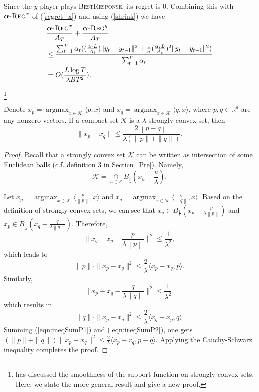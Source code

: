 \documentclass[final,12pt]{colt2018} %
\def\reals{\mathbb{R}}
\def\reals{\mathbb{R}}
\def\K{\mathcal{K}}
\def\argmax{\mathop{\arg\max}}
\def\balpha{\boldsymbol{\alpha}}
\def\BR{\textsc{BestResponse}\xspace}
\newcommand{\norm}[1]{\left\lVert#1\right\rVert}
\newcommand{\regret}[1]{\balpha\textsc{-Reg}^{#1}}
\begin{document}
Since the $y$-player plays \BR, its regret is $0$.
Combining this with $\regret{x}$ of (\ref{regret_x}) and using (\ref{shrink})
we have 
\begin{equation}
\begin{aligned}
&\frac{ \regret{x} }{ A_T} + \frac{ \regret{y} }{ A_T}
\\ & \leq  \frac{\sum_{t=1}^T
\alpha_t  ( (\frac{\alpha_t L}{A_t})  \| y_t - y_{t-1} \|^2 + \frac{1}{\sigma} (\frac{\alpha_t L }{A_t})^2  \| y_t - y_{t-1} \|^2 ) 
 }{ \sum_{t=1}^T \alpha_t}
\\ & =  O( \frac{L \log T }{\lambda B T^2}  ).
\end{aligned}
\end{equation}



\begin{lemma}  \label{lm:lip}
\footnote{\cite{P96} has discussed the smoothness of the support function on strongly convex sets.
Here, we state the more general result and give a new proof.}

Denote  
$x_p = \argmax_{x \in \K} \langle p, x\rangle $ and $x_q = \argmax_{x \in \K} \langle q, x\rangle $, where $p,q \in \reals^d$ are any nonzero vectors.  
If a compact set $\K$ is a $\lambda$-strongly convex set,
then 
\begin{equation}
    \| x_p - x_q \| \leq \frac{2 \norm{p - q}}{\lambda ( \| p \| + \|q \| )}.
\end{equation}
\end{lemma}

\begin{proof}
Recall that a strongly convex set $\K$ can be written as intersection of some Euclidean balls (c.f. definition 3 in Section~\ref{Pre}).
Namely,
    \[ \K = \underset{u \in \mathcal{S}}{\cap} B_{\frac{1}{\lambda}} \left( x_u - \frac{u}{\lambda} \right) .\]

    Let  ${x_p = \argmax_{x \in \K} \langle \frac{p}{\norm{p}}, x\rangle }$ and ${x_q = \argmax_{x \in \K} \langle \frac{q}{\norm{q}}, x \rangle}$.
    Based on the definition of strongly convex sets, we can see that
    $x_q \in B_{ \frac{1}{\lambda}  } ( x_p - \frac{p}{\lambda \norm{p}})$ and $x_p \in B_{\frac{1}{\lambda}  } ( x_q - \frac{q}{\lambda \norm{q}} )$.
    Therefore, 
    \[
        \| x_q - x_p -  \frac{p}{\lambda \norm{p}} \|^2 \leq \frac{1}{\lambda^2},
    \]
    which leads to
    \begin{equation}
        \label{eqn:ineqSumP1}
     \|p \| \cdot  \| x_p - x_q \|^2 \leq \frac{2}{\lambda} \langle x_p - x_q,  p \rangle.
    \end{equation}
    Similarly,
    \[
        \| x_p - x_q - \frac{q}{\lambda \|q\|} \|^2 \leq \frac{1}{\lambda^2}, 
    \]
    which results in
    \begin{equation}
        \label{eqn:ineqSumP2}
      \| q \| \cdot  \| x_p - x_q \|^2 \leq \frac{2}{\lambda} \langle x_q - x_p,  q \rangle.
    \end{equation}
    Summing (\ref{eqn:ineqSumP1}) and (\ref{eqn:ineqSumP2}), one gets
    $(\|p\| + \| q \|) \| x_p - x_q \|^2 \leq \frac{2}{\lambda} \langle x_p - x_q, p-q \rangle$.
    Applying the Cauchy-Schwarz inequality completes the proof.
\end{proof}
\end{document}
